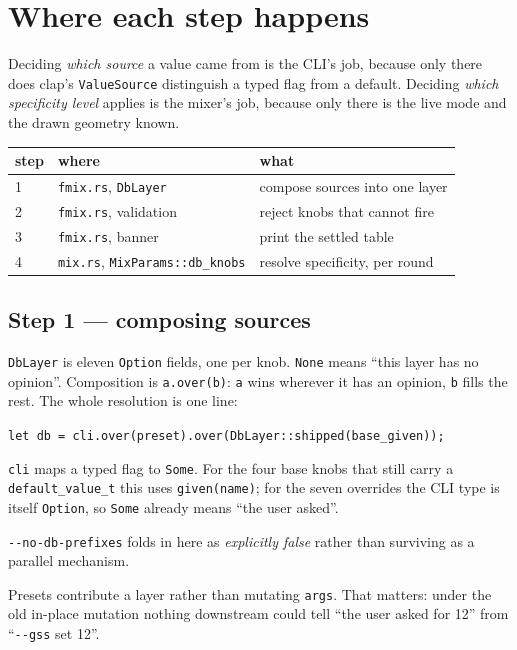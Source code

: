 \documentclass[11pt]{article}
\newcommand{\code}[1]{\texttt{#1}}
\begin{document}
\section{Where each step happens}

Deciding \emph{which source} a value came from is the CLI's job, because only
there does clap's \code{ValueSource} distinguish a typed flag from a default.
Deciding \emph{which specificity level} applies is the mixer's job, because
only there is the live mode and the drawn geometry known.

\begin{center}\small
\begin{tabular}{lll}
\toprule
step & where & what \\
\midrule
1 & \code{fmix.rs}, \code{DbLayer} & compose sources into one layer \\
2 & \code{fmix.rs}, validation & reject knobs that cannot fire \\
3 & \code{fmix.rs}, banner & print the settled table \\
4 & \code{mix.rs}, \code{MixParams::db\_knobs} & resolve specificity, per round \\
\bottomrule
\end{tabular}
\end{center}

\subsection{Step 1 --- composing sources}

\code{DbLayer} is eleven \code{Option} fields, one per knob. \code{None} means
``this layer has no opinion''. Composition is \code{a.over(b)}: \code{a} wins
wherever it has an opinion, \code{b} fills the rest. The whole resolution is
one line:

\begin{center}
\code{let db = cli.over(preset).over(DbLayer::shipped(base\_given));}
\end{center}

\code{cli} maps a typed flag to \code{Some}. For the four base knobs that
still carry a \code{default\_value\_t} this uses \code{given(name)}; for the
seven overrides the CLI type is itself \code{Option}, so \code{Some} already
means ``the user asked''.

\code{-{}-no-db-prefixes} folds in here as \emph{explicitly false} rather than
surviving as a parallel mechanism.

Presets contribute a layer rather than mutating \code{args}. That matters:
under the old in-place mutation nothing downstream could tell ``the user asked
for 12'' from ``\code{-{}-gss} set 12''.
\end{document}
